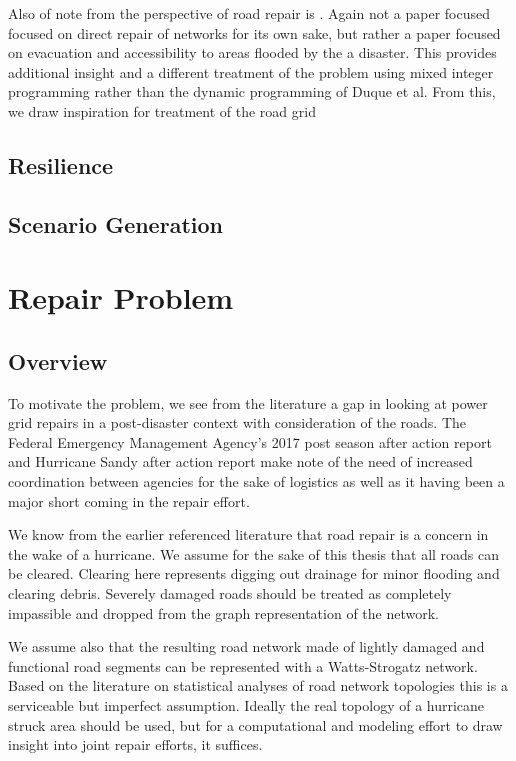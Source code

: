 \documentclass{article}
\begin{document}
		Also of note from the perspective of road repair is \cite{AksuEA2014}. Again not a paper focused focused on direct repair of networks for its own sake, but rather a paper focused on evacuation and accessibility to areas flooded by the a disaster. This provides additional insight and a different treatment of the problem using mixed integer programming rather than the dynamic programming of Duque et al. From this, we draw inspiration for treatment of the road grid
	
	\subsection{Resilience}
	

	\subsection{Scenario Generation}
	\section{Repair Problem}
	
	\subsection{Overview}
	To motivate the problem, we see from the literature a gap in looking at power grid repairs in a post-disaster context with consideration of the roads. The Federal Emergency Management Agency's 2017 post season after action report\cite{FEMA2017AAR}  and Hurricane Sandy after action report \cite{FEMASandyAAR} make note of the need of increased coordination between agencies for the sake of logistics as well as it having been a major short coming in the repair effort.
	
	We know from the earlier referenced literature that road repair is a concern in the wake of a hurricane. We assume for the sake of this thesis that all roads can be cleared. Clearing here represents digging out drainage for minor flooding and clearing debris. Severely damaged roads should be treated as completely impassible and dropped from the graph representation of the network.
	
	We assume also that the resulting road network made of lightly damaged and functional road segments can be represented with a Watts-Strogatz network. Based on the literature on statistical analyses of road network topologies \cite{LammerEA2006} \cite{ChanEA2011} this is a serviceable but imperfect assumption. Ideally the real topology of a hurricane struck area should be used, but for a computational and modeling effort to draw insight into joint repair efforts, it suffices.
		
\end{document}

